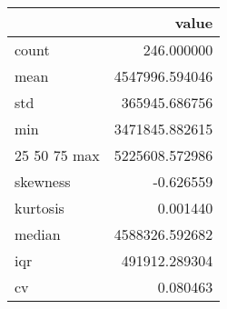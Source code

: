 \begin{tabular}{lr}
\toprule
 & value \\
\midrule
count & 246.000000 \\
mean & 4547996.594046 \\
std & 365945.686756 \\
min & 3471845.882615 \\
25%
50%
75%
max & 5225608.572986 \\
skewness & -0.626559 \\
kurtosis & 0.001440 \\
median & 4588326.592682 \\
iqr & 491912.289304 \\
cv & 0.080463 \\
\bottomrule
\end{tabular}
